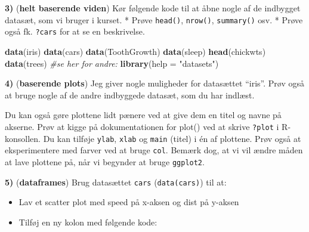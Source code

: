 \documentclass[
]{book}
\newenvironment{Shaded}{\begin{snugshade}}{\end{snugshade}}
\newcommand{\AttributeTok}[1]{\textcolor[rgb]{0.13,0.29,0.53}{#1}}
\newcommand{\CommentTok}[1]{\textcolor[rgb]{0.56,0.35,0.01}{\textit{#1}}}
\newcommand{\FunctionTok}[1]{\textcolor[rgb]{0.13,0.29,0.53}{\textbf{#1}}}
\newcommand{\NormalTok}[1]{#1}
\newcommand{\SpecialCharTok}[1]{\textcolor[rgb]{0.81,0.36,0.00}{\textbf{#1}}}
\newcommand{\StringTok}[1]{\textcolor[rgb]{0.31,0.60,0.02}{#1}}
\providecommand{\tightlist}{%
  \setlength{\itemsep}{0pt}\setlength{\parskip}{0pt}}
\begin{document}
\textbf{3)} (\textbf{helt baserende viden}) Kør følgende kode til at åbne nogle af de indbygget datasæt, som vi bruger i kurset.
* Prøve \texttt{head()}, \texttt{nrow()}, \texttt{summary()} osv.
* Prøve også fk. \texttt{?cars} for at se en beskrivelse.

\begin{Shaded}
\begin{Highlighting}[]
\FunctionTok{data}\NormalTok{(iris)}
\FunctionTok{data}\NormalTok{(cars)}
\FunctionTok{data}\NormalTok{(ToothGrowth)}
\FunctionTok{data}\NormalTok{(sleep)}
\FunctionTok{head}\NormalTok{(chickwts)}
\FunctionTok{data}\NormalTok{(trees)}
\CommentTok{\#se her for andre:}
\FunctionTok{library}\NormalTok{(}\AttributeTok{help =} \StringTok{"datasets"}\NormalTok{)}
\end{Highlighting}
\end{Shaded}

\textbf{4)} (\textbf{baserende plots}) Jeg giver nogle muligheder for datasættet ``iris''. Prøv også at bruge nogle af de andre indbyggede datasæt, som du har indlæst.

\begin{Shaded}
\end{Shaded}

Du kan også gøre plottene lidt pænere ved at give dem en titel og navne på akserne. Prøv at kigge på dokumentationen for plot() ved at skrive \texttt{?plot} i R-konsollen. Du kan tilføje \texttt{ylab}, \texttt{xlab} og \texttt{main} (titel) i én af plottene. Prøv også at eksperimentere med farver ved at bruge \texttt{col}. Bemærk dog, at vi vil ændre måden at lave plottene på, når vi begynder at bruge \texttt{ggplot2}.

\textbf{5)} (\textbf{dataframes}) Brug datasættet \texttt{cars} (\texttt{data(cars)}) til at:

\begin{itemize}
\tightlist
\item
  Lav et scatter plot med speed på x-aksen og dist på y-aksen
\item
  Tilføj en ny kolon med følgende kode:
\end{itemize}
\end{document}
